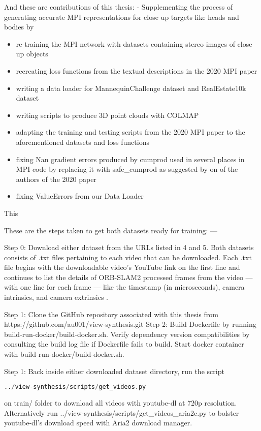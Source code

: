 And these are contributions of this thesis: -
Supplementing the process of generating accurate MPI representations for close up targets like heads and bodies by 
\begin{itemize}
    \item re-training the MPI network with datasets containing stereo images of close up objects  
    \item recreating loss functions from the textual descriptions in the 2020 MPI paper
    \item writing a data loader for MannequinChallenge dataset and RealEstate10k dataset
    \item writing scripts to produce 3D point clouds with COLMAP
    \item adapting the training and testing scripts from the 2020 MPI paper to the aforementioned datasets and loss functions
    \item fixing Nan gradient errors produced by cumprod used in several places in MPI code by replacing it with safe\_cumprod as suggested by on of the authors of the 2020 paper
    \item fixing ValueErrors from our Data Loader
\end{itemize}
This 



These are the steps taken to get both datasets ready for training: ---

Step 0: Download either dataset from the URLs listed in 4 and 5. Both datasets consists of .txt files pertaining to each video that can be downloaded. Each .txt file begins with the downloadable video’s YouTube link on the first line and continues to list the details of ORB-SLAM2 processed frames from the video --- with one line for each frame --- like the timestamp (in microseconds), camera intrinsics, and camera extrinsics .

Step 1: Clone the GitHub repository associated with this thesis from https://github.com/au001/view-synthesis.git
Step 2: Build Dockerfile by running build-run-docker/build-docker.sh. Verify dependency version compatibilities by consulting the build log file if Dockerfile fails to build. Start docker container with build-run-docker/build-docker.sh.


Step 1: Back inside either downloaded dataset directory, run the script \begin{lstlisting}[language=Python] ../view-synthesis/scripts/get_videos.py \end{lstlisting} on train/ folder to download all videos with youtube-dl at 720p resolution. Alternatively run ../view-synthesis/scripts/get_videos_aria2c.py to bolster youtube-dl’s download speed with Aria2 download manager.  

